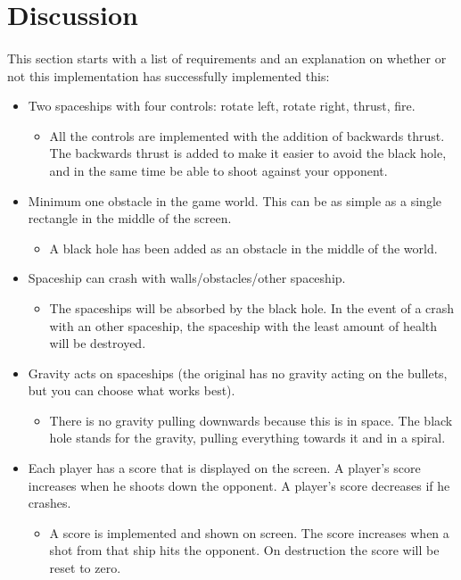 \documentclass{article}
\begin{document}
\section{Discussion}
\paragraph{}
This section starts with a list of requirements and an explanation on whether or not this implementation has successfully implemented this:
\begin{itemize}
	\item Two spaceships with four controls: rotate left, rotate right, thrust, fire.
	\begin{itemize}
		\item All the controls are implemented with the addition of backwards thrust. The backwards thrust is added to make it easier to avoid the black hole, and in the same time be able to shoot against your opponent.
	\end{itemize}
	\item Minimum one obstacle in the game world. This can be as simple as a single rectangle in the middle of the screen.
	\begin{itemize}
		\item A black hole has been added as an obstacle in the middle of the world.
	\end{itemize}
	\item Spaceship can crash with walls/obstacles/other spaceship.
	\begin{itemize}
		\item The spaceships will be absorbed by the black hole. In the event of a crash with an other spaceship, the spaceship with the least amount of health will be destroyed.
	\end{itemize}
	\item Gravity acts on spaceships (the original has no gravity acting on the
	bullets, but you can choose what works best).
	\begin{itemize}
		\item There is no gravity pulling downwards because this is in space. The black hole stands for the gravity, pulling everything towards it and in a spiral.
	\end{itemize}
	\item Each player has a score that is displayed on the screen. A player's score increases when he shoots down the opponent. A player's score decreases if he crashes.
	\begin{itemize}
		\item A score is implemented and shown on screen. The score increases when a shot from that ship hits the opponent. On destruction the score will be reset to zero.

\end{itemize}
\end{itemize}
\end{document}
